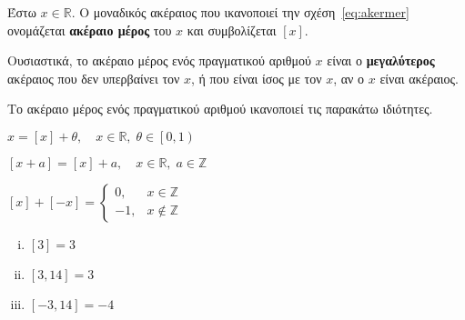 
\begin{mybox1}
\begin{dfn}
  Έστω $ x \in \mathbb{R} $. Ο μοναδικός ακέραιος που ικανοποιεί την 
σχέση~\eqref{eq:akermer} ονομάζεται \textbf{ακέραιο μέρος} του $x$ και συμβολίζεται $ [x] $.
\end{dfn}
\end{mybox1}

Ουσιαστικά, το ακέραιο μέρος ενός πραγματικού αριθμού $ x $ είναι ο \textbf{μεγαλύτερος} ακέραιος που δεν υπερβαίνει τον $x$, ή που είναι ίσος με τον $x$,
αν ο $x$ είναι ακέραιος.

Το ακέραιο μέρος ενός πραγματικού αριθμού ικανοποιεί τις παρακάτω ιδιότητες.
\begin{myitemize}
  \item $ x = [x]+ \theta, \quad x \in \mathbb{R}, \; \theta \in \left[0,1\right) $
  \item $ [x+a]= [x] + a, \quad x \in \mathbb{R}, \; a \in \mathbb{Z} $
  \item $ [x]+[-x] = 
    \begin{cases} 
      0, & x \in \mathbb{Z} \\
      -1, & x \not \in \mathbb{Z}
    \end{cases}$
\end{myitemize}

\begin{example}
\item {}
  \begin{enumerate}[(i)]
    \item $ [3]=3 $
    \item $ [3,14] = 3  $
    \item $ [-3,14] =-4 $
  \end{enumerate}
\end{example}



